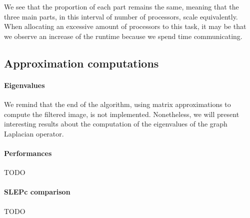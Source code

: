 We see that the proportion of each part remains the same, meaning that the three main parts, in this interval of number of processors, scale equivalently.
When allocating an excessive amount of processors to this task, it may be that we observe an increase of the runtime because we spend time communicating.

\subsection{Approximation computations}

\paragraph{Eigenvalues}
We remind that the end of the algorithm, using matrix approximations to compute the filtered image, is not implemented.
Nonetheless, we will present interesting results about the computation of the eigenvalues of the graph Laplacian operator.

\paragraph{Performances}
TODO

\paragraph{SLEPc comparison}
TODO
